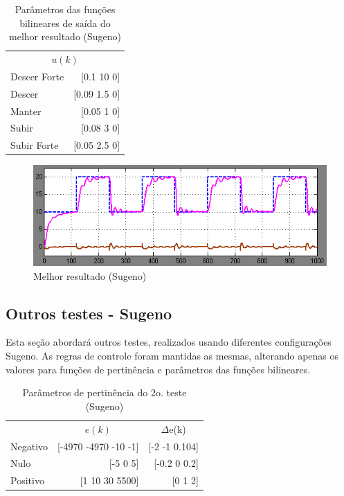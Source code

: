 \documentclass[
	twoside,				%
	twocolumn,				%
	english,				%
	brazil,					%
]{article}
\begin{document}
\begin{table}[!h]
\caption{Parâmetros das funções bilineares de saída do melhor resultado (Sugeno)}
\label{tab:bilinearSugeno0}
\centering
\begin{tabular}{lr}
\toprule
\multicolumn{2}{c}{$u(k)$} \\
\cmidrule(r){1-2}
Descer Forte & [0.1 10 0] \\
Descer & [0.09 1.5 0] \\
Manter & [0.05 1 0] \\
Subir & [0.08 3 0] \\
Subir Forte & [0.05 2.5 0] \\
\bottomrule
\end{tabular}
\end{table}


\begin{figure}[!h]
    \centering
    \includegraphics[width=\columnwidth]{sugeno1.png}
    \caption { Melhor resultado (Sugeno)}
    \label{fig:resultSugeno0}
\end{figure}


\subsection{Outros testes - Sugeno}

Esta seção abordará outros testes, realizados usando diferentes configurações Sugeno. As regras de controle foram mantidas as mesmas, alterando apenas os valores para funções de pertinência e parâmetros das funções bilineares.

\begin{table}[!h]
\caption{Parâmetros de pertinência do 2o. teste \\ (Sugeno)}
\centering
\begin{tabular}{lrr}
\toprule
& \multicolumn{1}{c}{$e(k)$} & \multicolumn{1}{c}{$\Delta$e(k)} \\
\cmidrule(r){1-3} 
Negativo & [-4970 -4970 -10 -1] & [-2 -1 0.104] \\
Nulo & [-5 0 5] & [-0.2 0 0.2] \\
Positivo & [1 10 30 5500] & [0 1 2] \\
\bottomrule
\end{tabular}
\end{table}
\end{document}
